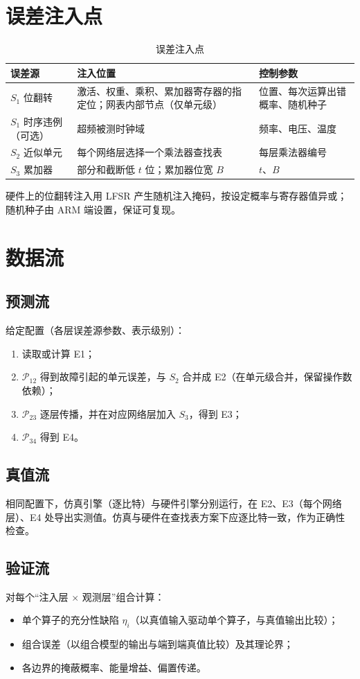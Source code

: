 \documentclass[11pt,a4paper]{ctexart}
\begin{document}
\section{误差注入点}
\begin{table}[h]
\centering
\small
\begin{tabularx}{\textwidth}{@{}lXX@{}}
\toprule
误差源 & 注入位置 & 控制参数 \\
\midrule
$S_1$ 位翻转 & 激活、权重、乘积、累加器寄存器的指定位；网表内部节点（仅单元级） & 位置、每次运算出错概率、随机种子 \\
$S_1$ 时序违例（可选） & 超频被测时钟域 & 频率、电压、温度 \\
$S_2$ 近似单元 & 每个网络层选择一个乘法器查找表 & 每层乘法器编号 \\
$S_3$ 累加器 & 部分和截断低 $t$ 位；累加器位宽 $B$ & $t$、$B$ \\
\bottomrule
\end{tabularx}
\caption{误差注入点}
\end{table}

硬件上的位翻转注入用 LFSR 产生随机注入掩码，按设定概率与寄存器值异或；随机种子由 ARM 端设置，保证可复现。

\section{数据流}

\subsection{预测流}
给定配置（各层误差源参数、表示级别）：
\begin{enumerate}[leftmargin=*]
  \item 读取或计算 E1；
  \item $\mathcal P_{12}$ 得到故障引起的单元误差，与 $S_2$ 合并成 E2（在单元级合并，保留操作数依赖）；
  \item $\mathcal P_{23}$ 逐层传播，并在对应网络层加入 $S_3$，得到 E3；
  \item $\mathcal P_{34}$ 得到 E4。
\end{enumerate}

\subsection{真值流}
相同配置下，仿真引擎（逐比特）与硬件引擎分别运行，在 E2、E3（每个网络层）、E4 处导出实测值。仿真与硬件在查找表方案下应逐比特一致，作为正确性检查。

\subsection{验证流}
对每个“注入层 $\times$ 观测层”组合计算：
\begin{itemize}[leftmargin=*]
  \item 单个算子的充分性缺陷 $\eta_i$（以真值输入驱动单个算子，与真值输出比较）；
  \item 组合误差（以组合模型的输出与端到端真值比较）及其理论界；
  \item 各边界的掩蔽概率、能量增益、偏置传递。
\end{itemize}
\end{document}
